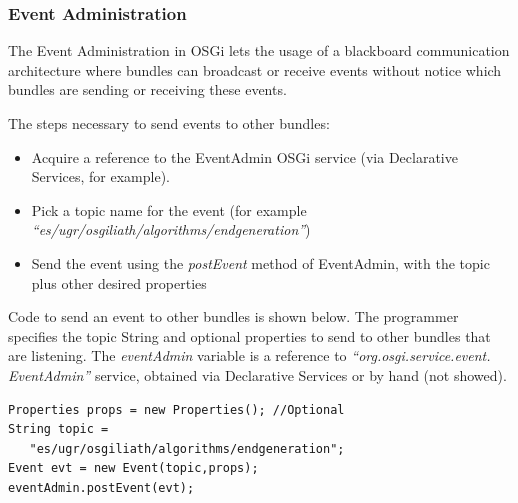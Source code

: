 
\subsubsection{Event Administration}
The Event Administration in OSGi lets the usage of a blackboard communication architecture where bundles can broadcast or receive events without notice which bundles are sending or receiving these events.


The steps necessary to send events to other bundles:
\begin{itemize}
\item Acquire a reference to the EventAdmin OSGi service (via Declarative Services, for example).
\item Pick a topic name for the event (for example {\em ``es/ugr/osgiliath/algorithms/endgeneration''})
\item Send the event using the {\em postEvent} method of EventAdmin, with the topic plus other desired properties %
\end{itemize}

Code to send an event to other bundles is shown below. The programmer specifies the topic String and optional properties to send to other bundles that are listening. The {\em eventAdmin} variable is a reference to {\em ``org.osgi.service.event. EventAdmin''} service, obtained via Declarative Services or by hand (not showed).

\begin{verbatim}
Properties props = new Properties(); //Optional
String topic = 
   "es/ugr/osgiliath/algorithms/endgeneration";
Event evt = new Event(topic,props);
eventAdmin.postEvent(evt);
\end{verbatim}
		
